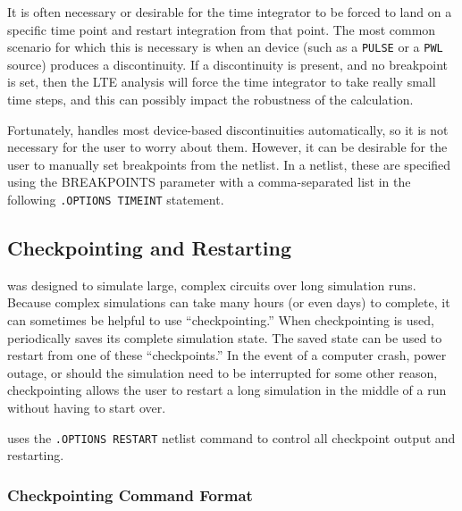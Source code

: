 
It is often necessary or desirable for the time integrator to be
forced to land on a specific time point and restart integration from
that point.  The most common scenario for which this is necessary is
when an device (such as a \texttt{PULSE} or a \texttt{PWL} source)
produces a discontinuity.  If a discontinuity is present, and no
breakpoint is set, then the LTE analysis will force the time
integrator to take really small time steps, and this can possibly
impact the robustness of the calculation.

Fortunately, \Xyce{} handles most device-based discontinuities
automatically, so it is not necessary for the user to worry about
them.  However, it can be desirable for the user to manually set
breakpoints from the netlist.  In a \Xyce{} netlist, these are
specified using the BREAKPOINTS parameter with a comma-separated list
in the following \texttt{.OPTIONS TIMEINT} statement.


\subsection{Checkpointing and Restarting}
\label{Restart}
 

\Xyce{} was designed to simulate large, complex circuits over long
simulation runs.  Because complex simulations can take many hours (or
even days) to complete, it can sometimes be helpful to use
``checkpointing.''  When checkpointing is used, \Xyce{} periodically
saves its complete simulation state.  The saved state can be used to
restart \Xyce{} from one of these ``checkpoints.''  In the event of a
computer crash, power outage, or should the simulation need to be
interrupted for some other reason, checkpointing allows the user to
restart a long simulation in the middle of a run without having to
start over.

\Xyce{} uses the   \verb|.OPTIONS RESTART|
netlist command to control all checkpoint output and restarting.  

\subsubsection{Checkpointing Command Format}
  

